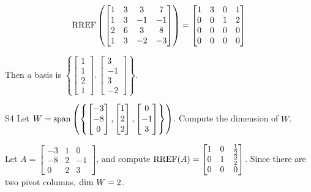 \documentclass{sbgLAexam}
\begin{document}
\begin{solution}
$$\operatorname{RREF}\left(\begin{bmatrix} 1 & 3 & 3 & 7 \\ 1 & 3 & -1 & -1 \\ 2 & 6 & 3 & 8 \\ 1 & 3 & -2 & -3 \end{bmatrix}\right) = \begin{bmatrix} 1 & 3 & 0 & 1 \\ 0 & 0 & 1 & 2 \\ 0 & 0 & 0 & 0 \\  0 & 0 & 0 & 0 \end{bmatrix}$$

Then a basis is 
$ \left\{ \begin{bmatrix} 1 \\ 1 \\ 2 \\ 1 \end{bmatrix} , \begin{bmatrix} 3 \\ -1 \\ 3 \\ -2 \end{bmatrix}\right\} $.
\end{solution}


\begin{problem}{S4}
Let $W = {\rm span} \left( \left\{  \begin{bmatrix} -3 \\ -8 \\ 0 \end{bmatrix}, \begin{bmatrix} 1 \\ 2 \\ 2 \end{bmatrix}, \begin{bmatrix} 0 \\ -1 \\ 3 \end{bmatrix} \right\} \right)$.  Compute the dimension of $W$.
\end{problem}
\begin{solution}
Let $A= \begin{bmatrix}-3 & 1 & 0 \\ -8 & 2 & -1 \\ 0 & 2 & 3\end{bmatrix}$, and compute $\operatorname{RREF}(A) = \begin{bmatrix} 1 & 0 & \frac{1}{2} \\ 0 & 1 & \frac{3}{2} \\ 0 & 0 & 0 \end{bmatrix}$.
Since there are two pivot columns, ${\rm dim}\ W = 2$.  
\end{solution}
\end{document}
